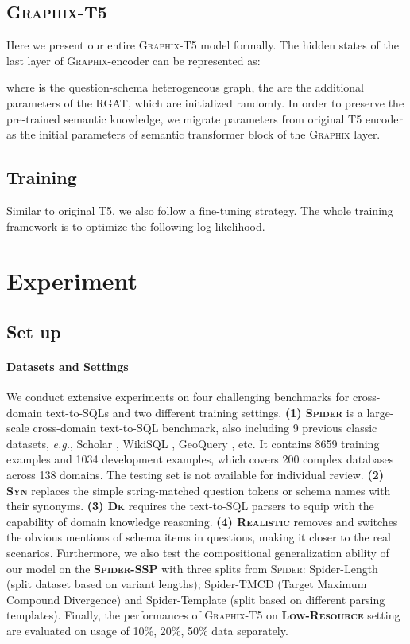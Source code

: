 \documentclass[letterpaper]{article} \usepackage{aaai23}  \usepackage{times}  \usepackage{helvet}  \usepackage{courier}  \usepackage[hyphens]{url}  \usepackage{graphicx} \usepackage{amsmath}
\newcommand{\graphix}{\textsc{Graphix}\xspace}
\def\eg{\emph{e.g.}}
\begin{document}
\subsection{\graphix-T5}
Here we present our entire \graphix-T5 model formally. The hidden states of the last layer of \graphix-encoder can be represented as:

where  is the question-schema heterogeneous graph, the  are the additional parameters of the RGAT, which are initialized randomly. In order to preserve the pre-trained semantic knowledge, we migrate parameters  from original T5 encoder as the initial parameters of semantic transformer block of the \graphix layer.



\subsection{Training}
Similar to original T5, we also follow a fine-tuning strategy. The whole training framework is to optimize the following log-likelihood.



\section{Experiment}

\subsection{Set up}

\paragraph{Datasets and Settings}
We conduct extensive experiments on four challenging benchmarks for cross-domain text-to-SQLs and two different training settings. 
\textbf{(1) \textsc{Spider}} \citep{yu-etal-2018-spider} is a large-scale cross-domain text-to-SQL benchmark, also including 9 previous classic datasets, \eg, Scholar \citep{scholar}, WikiSQL \citep{wikiSQL}, GeoQuery \citep{geoquery}, etc. 
It contains 8659 training examples and 1034 development examples, which covers 200 complex databases across 138 domains. The testing set is not available for individual review.
\textbf{(2) \textsc{Syn}} \citep{Syn} replaces the simple string-matched question tokens or schema names with their synonyms.
\textbf{(3) \textsc{Dk}} \citep{DK} requires the text-to-SQL parsers to equip with the capability of domain knowledge reasoning.
\textbf{(4) \textsc{Realistic}} removes and switches the obvious mentions of schema items in questions, making it closer to the real scenarios. 
Furthermore, we also test the compositional generalization ability of our model on the
\textbf{\textsc{Spider-SSP}} \citep{shaw-etal-2021-compositional} with three splits from \textsc{Spider}: Spider-Length (split dataset based on variant lengths); Spider-TMCD (Target Maximum Compound Divergence) and Spider-Template (split based on different parsing templates). Finally, the performances of \graphix-T5 on \textbf{\textsc{Low-Resource}} setting are evaluated on usage of 10\%, 20\%, 50\% data separately.
\end{document}
